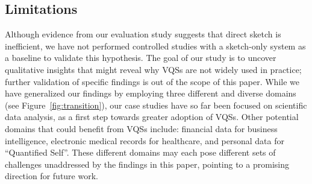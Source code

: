 \subsection{Limitations}
\par Although evidence from our evaluation study 
suggests that direct sketch is inefficient, 
we have not performed controlled studies 
with a sketch-only system as a baseline to validate this hypothesis. 
The goal of our study is to uncover qualitative insights 
that might reveal why VQSs are not widely used in practice;
further validation of specific findings is out of the scope of this paper. 
While we have generalized our findings by employing 
three different and diverse domains (see Figure~\ref{fig:transition}), 
our case studies have so far 
been focused on scientific data analysis, 
as a first step towards greater adoption of VQSs. 
Other potential domains that could benefit from VQSs include: 
financial data for business intelligence, 
electronic medical records for healthcare, 
and personal data for ``Quantified Self''. 
These different domains may each pose different
 sets of challenges unaddressed 
 by the findings in this paper, 
 pointing to a promising direction for future work. 
